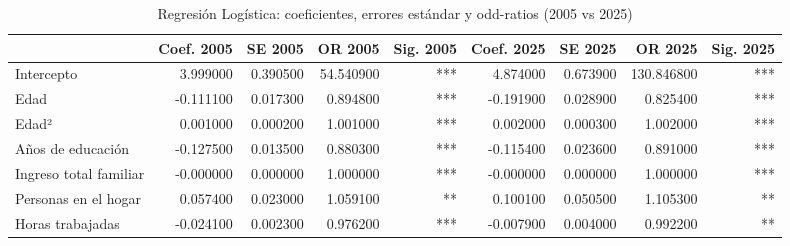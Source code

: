 \begin{table}
\caption{Regresión Logística: coeficientes, errores estándar y odd-ratios (2005 vs 2025)}
\label{tab:logit}
\begin{tabular}{lrrrrrrrr}
\toprule
 & Coef. 2005 & SE 2005 & OR 2005 & Sig. 2005 & Coef. 2025 & SE 2025 & OR 2025 & Sig. 2025 \\
\midrule
Intercepto & 3.999000 & 0.390500 & 54.540900 & *** & 4.874000 & 0.673900 & 130.846800 & *** \\
Edad & -0.111100 & 0.017300 & 0.894800 & *** & -0.191900 & 0.028900 & 0.825400 & *** \\
Edad² & 0.001000 & 0.000200 & 1.001000 & *** & 0.002000 & 0.000300 & 1.002000 & *** \\
Años de educación & -0.127500 & 0.013500 & 0.880300 & *** & -0.115400 & 0.023600 & 0.891000 & *** \\
Ingreso total familiar & -0.000000 & 0.000000 & 1.000000 & *** & -0.000000 & 0.000000 & 1.000000 & *** \\
Personas en el hogar & 0.057400 & 0.023000 & 1.059100 & ** & 0.100100 & 0.050500 & 1.105300 & ** \\
Horas trabajadas & -0.024100 & 0.002300 & 0.976200 & *** & -0.007900 & 0.004000 & 0.992200 & ** \\
\bottomrule
\end{tabular}
\end{table}
